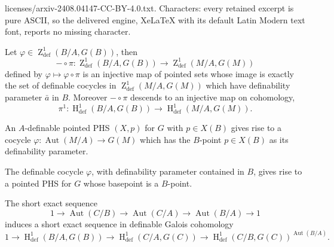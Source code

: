 \documentclass[10pt,a4paper]{amsart}
\DeclareMathOperator{\HH}{H} %
\DeclareMathOperator{\ZZ}{Z} %
\DeclareMathOperator{\aut}{Aut} %
\DeclareMathOperator{\defin}{def} %
\begin{document}
licenses/arxiv-2408.04147-CC-BY-4.0.txt. Characters: every retained excerpt is pure ASCII, so the delivered engine, XeLaTeX with its default Latin Modern text font, reports no missing character.
\begin{lemma}\label{ZZ inj}
    Let $\varphi \in \ZZ^1_{\defin}(B/A,G(B))$, then $$- \circ\pi: \ZZ^1_{\defin}(B/A,G(B)) \to \ZZ^1_{\defin}(M/A,G(M))$$ defined by $\varphi \mapsto \varphi \circ \pi$ is an injective map of pointed sets whose image is exactly the set of definable cocycles in $\ZZ^1_{\defin}(M/A,G(M))$ which have definability parameter $\bar{a}$ in $B$. Moreover $-\circ \pi$ descends to an injective map on cohomology, $$\pi^1: \HH^1_{\defin}(B/A,G(B)) \to \HH^1_{\defin}(M/A,G(M)).$$
\end{lemma}

\begin{lemma}\label{pPHS to cocycle}
    An $A$-definable pointed PHS $(X,p)$ for $G$ with $p \in X(B)$ gives rise to a cocycle $\varphi:\aut(M/A) \to G(M)$ which has the $B$-point $p \in X(B)$ as its definability parameter.
\end{lemma}

\begin{lemma}\label{cocycle to pPHS}
    The definable cocycle $\varphi$, with definability parameter contained in $B$, gives rise to a pointed PHS for $G$ whose basepoint is a $B$-point.
\end{lemma}

\begin{theorem}
    The short exact sequence $$1 \to \aut(C/B) \to \aut(C/A) \to \aut(B/A) \to 1$$ induces a short exact sequence in definable Galois cohomology $$1 \to \HH^1_{\defin}(B/A,G(B)) \to \HH^1_{\defin}(C/A,G(C)) \to \HH^1_{\defin}(C/B,G(C))^{\aut(B/A)}.$$
\end{theorem}
\end{document}
